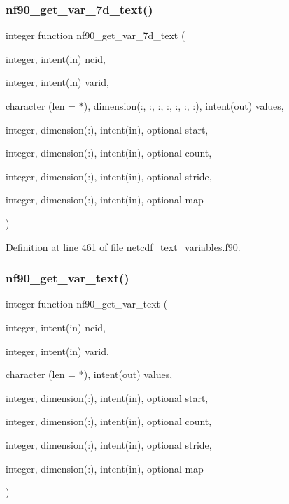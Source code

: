 \subsubsection{\texorpdfstring{nf90\+\_\+get\+\_\+var\+\_\+7d\+\_\+text()}{nf90\_get\_var\_7d\_text()}}
{\footnotesize\ttfamily integer function nf90\+\_\+get\+\_\+var\+\_\+7d\+\_\+text (\begin{DoxyParamCaption}\item[{integer, intent(in)}]{ncid,  }\item[{integer, intent(in)}]{varid,  }\item[{character (len = $\ast$), dimension(\+:, \+:, \+:, \+:, \+:, \+:, \+:), intent(out)}]{values,  }\item[{integer, dimension(\+:), intent(in), optional}]{start,  }\item[{integer, dimension(\+:), intent(in), optional}]{count,  }\item[{integer, dimension(\+:), intent(in), optional}]{stride,  }\item[{integer, dimension(\+:), intent(in), optional}]{map }\end{DoxyParamCaption})}



Definition at line 461 of file netcdf\+\_\+text\+\_\+variables.\+f90.

\mbox{\label{netcdf__text__variables_8f90_acc3d60da31f80b17d7fd5e06d4290a43}} 
\subsubsection{\texorpdfstring{nf90\+\_\+get\+\_\+var\+\_\+text()}{nf90\_get\_var\_text()}}
{\footnotesize\ttfamily integer function nf90\+\_\+get\+\_\+var\+\_\+text (\begin{DoxyParamCaption}\item[{integer, intent(in)}]{ncid,  }\item[{integer, intent(in)}]{varid,  }\item[{character (len = $\ast$), intent(out)}]{values,  }\item[{integer, dimension(\+:), intent(in), optional}]{start,  }\item[{integer, dimension(\+:), intent(in), optional}]{count,  }\item[{integer, dimension(\+:), intent(in), optional}]{stride,  }\item[{integer, dimension(\+:), intent(in), optional}]{map }\end{DoxyParamCaption})}



